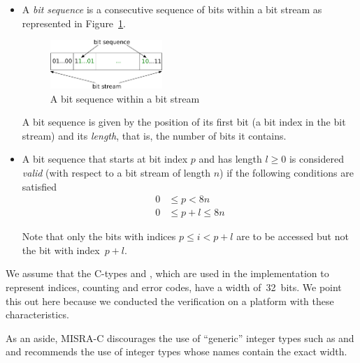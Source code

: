 \begin{itemize}
\item
A \emph{bit sequence} is a consecutive sequence of bits within a bit stream
as represented in Figure~\ref{fig:bitsequence}.
\begin{figure}[hbt]
\begin{center}
\includegraphics[width=0.40\textwidth]{figures/bit_sequence.pdf}
\caption{\label{fig:bitsequence} A bit sequence within a bit stream}
\end{center}
\end{figure}

A bit sequence is given by the position of its first bit (a bit index in the bit stream)
and its \emph{length}, that is, the number of bits it contains.

\item

A bit sequence that starts at bit index $p$ and has
length $l \geq 0$ is considered \emph{valid} (with respect to a bit stream of length $n$)
if the following conditions are satisfied
\begin{align*}
  0 &\leq p < 8n \\
  0 &\leq p + l \leq 8n
\end{align*}

Note that only the bits with indices $p \leq i < p + l$ are to be accessed
but not the bit with index~$p+l$.

\end{itemize}

We assume that the C-types  and , which
are used in the implementation to represent indices, counting and error codes,
have a width of~32~bits.
We point this out here because we conducted the verification on a platform with
these characteristics.

As an aside, MISRA-C discourages the use of ``generic'' integer types
such as  and  and recommends the use of integer types whose names
contain the exact width.

